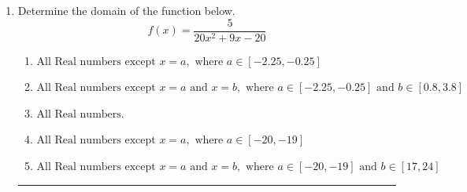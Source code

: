 \documentclass[14pt]{extbook}
\newcommand{\litem}[1]{\item#1\hspace*{-1cm}\rule{\textwidth}{0.4pt}}
\begin{document}
\begin{enumerate}
{\begin{enumerate}[label=\Alph*.]
\end{enumerate} }
\litem{
Determine the domain of the function below.\[ f(x) = \frac{5}{20x^{2} +9 x -20} \]\begin{enumerate}[label=\Alph*.]
\item \( \text{All Real numbers except } x = a, \text{ where } a \in [-2.25, -0.25] \)
\item \( \text{All Real numbers except } x = a \text{ and } x = b, \text{ where } a \in [-2.25, -0.25] \text{ and } b \in [0.8, 3.8] \)
\item \( \text{All Real numbers.} \)
\item \( \text{All Real numbers except } x = a, \text{ where } a \in [-20, -19] \)
\item \( \text{All Real numbers except } x = a \text{ and } x = b, \text{ where } a \in [-20, -19] \text{ and } b \in [17, 24] \)

\end{enumerate} }
\end{enumerate}
\end{document}
